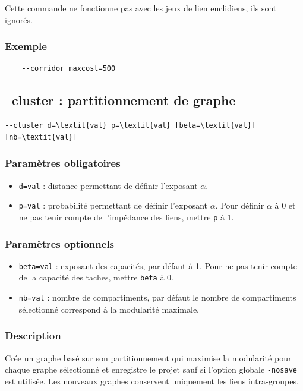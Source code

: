 \documentclass[a4paper,10pt]{report}
\begin{document}
Cette commande ne fonctionne pas avec les jeux de lien euclidiens, ils sont ignorés.

\subsubsection{Exemple}
\begin{Verbatim}
	--corridor maxcost=500
\end{Verbatim}

\subsection{--cluster : partitionnement de graphe}
\begin{Verbatim}[commandchars=\\\{\}]
--cluster d=\textit{val} p=\textit{val} [beta=\textit{val}] [nb=\textit{val}]
\end{Verbatim}

\subsubsection{Paramètres obligatoires}
\begin{itemize}
	\item \verb|d=val| : distance permettant de définir l'exposant $\alpha$.
	\item \verb|p=val| : probabilité permettant de définir l'exposant $\alpha$. Pour définir $\alpha$ à 0 et ne pas tenir compte de l'impédance des liens, mettre \verb|p| à 1.
\end{itemize}

\subsubsection{Paramètres optionnels}
\begin{itemize}
	\item \verb|beta=val| : exposant des capacités, par défaut à 1. Pour ne pas tenir compte de la capacité des taches, mettre \verb|beta| à 0.
	\item \verb|nb=val| : nombre de compartiments, par défaut le nombre de compartiments sélectionné correspond à la modularité maximale.
\end{itemize}

\subsubsection{Description}
Crée un graphe basé sur son partitionnement qui maximise la modularité \cite{Newman2006} pour chaque graphe sélectionné et enregistre le projet sauf si l'option globale \verb|-nosave| est utilisée.
Les nouveaux graphes conservent uniquement les liens intra-groupes.
\end{document}
